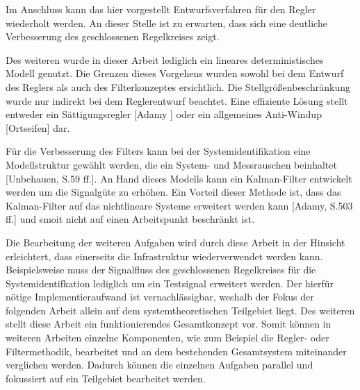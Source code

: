 Im Anschluss kann das hier vorgestellt Entwurfsverfahren für den Regler wiederholt werden. An dieser Stelle ist zu erwarten, dass sich eine deutliche Verbesserung des geschlossenen Regelkreises zeigt. 

Des weiteren wurde in dieser Arbeit lediglich ein lineares deterministisches Modell genutzt. Die Grenzen dieses Vorgehens wurden sowohl bei dem Entwurf des Reglers als auch des Filterkonzeptes ersichtlich. Die Stellgrößenbeschränkung wurde nur indirekt bei dem Reglerentwurf beachtet. Eine effiziente Lösung stellt entweder ein Sättigungsregler [Adamy ] oder ein allgemeines Anti-Windup [Ortseifen] dar.

Für die Verbesserung des Filters kann bei der Systemidentifikation eine Modellstruktur gewählt werden, die ein System- und Messrauschen beinhaltet [Unbehauen, S.59 ff.]. An Hand dieses Modells kann ein Kalman-Filter entwickelt werden um die Signalgüte zu erhöhen. Ein Vorteil dieser Methode ist, dass das Kalman-Filter auf das nichtlineare Systeme erweitert werden kann [Adamy, S.503 ff.] und smoit nicht auf einen Arbeitspunkt beschränkt ist.

Die Bearbeitung der weiteren Aufgaben wird durch diese Arbeit in der Hinsicht erleichtert, dass einerseits die Infrastruktur wiederverwendet werden kann. Beispielsweise muss der Signalfluss des geschlossenen Regelkreises für die Systemidentifkation lediglich um ein Testsignal erweitert werden. Der hierfür nötige Implementieraufwand ist vernachlässigbar, weshalb der Fokus der folgenden Arbeit allein auf dem systemtheoretischen Teilgebiet liegt. Des weiteren stellt diese Arbeit ein funktionierendes Gesamtkonzept vor. Somit können in weiteren Arbeiten einzelne Komponenten, wie zum Beispiel die Regler- oder Filtermethodik, bearbeitet und an dem bestehenden Gesamtsystem miteinander verglichen werden. Dadurch können die einzelnen Aufgaben parallel und fokussiert auf ein Teilgebiet bearbeitet werden.